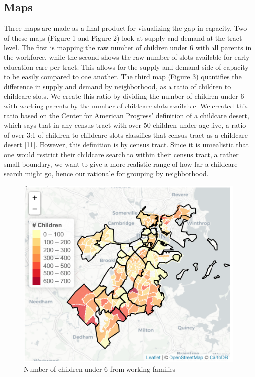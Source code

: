 \documentclass[10pt,letterpaper]{article}
\begin{document}
\subsection{Maps}\label{maps}

Three maps are made as a final product for visualizing the gap in
capacity. Two of these maps (Figure 1 and Figure 2) look at supply and
demand at the tract level. The first is mapping the raw number of
children under 6 with all parents in the workforce, while the second
shows the raw number of slots available for early education care per
tract. This allows for the supply and demand side of capacity to be
easily compared to one another. The third map (Figure 3) quantifies the
difference in supply and demand by neighborhood, as a ratio of children
to childcare slots. We create this ratio by dividing the number of
children under 6 with working parents by the number of childcare slots
available. We created this ratio based on the Center for American
Progress' definition of a childcare desert, which says that in any
census tract with over 50 children under age five, a ratio of over 3:1
of children to childcare slots classifies that census tract as a
childcare desert {[}11{]}. However, this definition is by census tract.
Since it is unrealistic that one would restrict their childcare search
to within their census tract, a rather small boundary, we want to give a
more realistic range of how far a childcare search might go, hence our
rationale for grouping by neighborhood.

\begin{figure}

{\centering \includegraphics[width=0.9\linewidth]{fig1_capacitytractdemand} 

}

\caption{Number of children under 6 from working families}\label{fig:unnamed-chunk-1}
\end{figure}
\end{document}

